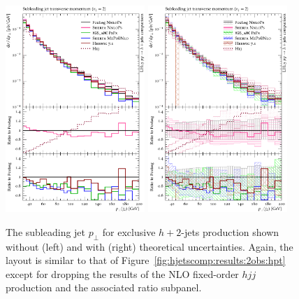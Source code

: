 \begin{figure}[t!]
  \centering
  \includegraphics[width=0.47\textwidth]{figures/hjetscomp_u_jet2_pT_excl.pdf}
  \hfill
  \includegraphics[width=0.47\textwidth]{figures/hjetscomp_jet2_pT_excl.pdf}
  \caption{\label{fig:hjetscomp:results:2obs:jet2_pt_excl}%
    The subleading jet $p_\perp$ for exclusive $h+2$-jets production
    shown without (left) and with (right) theoretical uncertainties.
    Again, the layout is similar to that of
    Figure~\ref{fig:hjetscomp:results:2obs:hpt} except for
    dropping the results of the NLO fixed-order $hjj$ production and
    the associated ratio subpanel.}
\end{figure}

